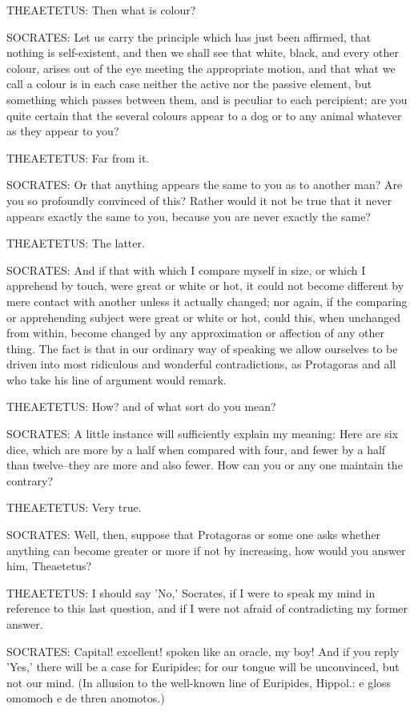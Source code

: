 THEAETETUS: Then what is colour?

SOCRATES: Let us carry the principle which has just been affirmed, that
nothing is self-existent, and then we shall see that white, black,
and every other colour, arises out of the eye meeting the appropriate
motion, and that what we call a colour is in each case neither the
active nor the passive element, but something which passes between
them, and is peculiar to each percipient; are you quite certain that the
several colours appear to a dog or to any animal whatever as they appear
to you?

THEAETETUS: Far from it.

SOCRATES: Or that anything appears the same to you as to another man?
Are you so profoundly convinced of this? Rather would it not be true
that it never appears exactly the same to you, because you are never
exactly the same?

THEAETETUS: The latter.

SOCRATES: And if that with which I compare myself in size, or which
I apprehend by touch, were great or white or hot, it could not become
different by mere contact with another unless it actually changed; nor
again, if the comparing or apprehending subject were great or white
or hot, could this, when unchanged from within, become changed by any
approximation or affection of any other thing. The fact is that in
our ordinary way of speaking we allow ourselves to be driven into most
ridiculous and wonderful contradictions, as Protagoras and all who take
his line of argument would remark.

THEAETETUS: How? and of what sort do you mean?

SOCRATES: A little instance will sufficiently explain my meaning: Here
are six dice, which are more by a half when compared with four, and
fewer by a half than twelve--they are more and also fewer. How can you
or any one maintain the contrary?

THEAETETUS: Very true.

SOCRATES: Well, then, suppose that Protagoras or some one asks whether
anything can become greater or more if not by increasing, how would you
answer him, Theaetetus?

THEAETETUS: I should say 'No,' Socrates, if I were to speak my mind
in reference to this last question, and if I were not afraid of
contradicting my former answer.

SOCRATES: Capital! excellent! spoken like an oracle, my boy! And if you
reply 'Yes,' there will be a case for Euripides; for our tongue will be
unconvinced, but not our mind. (In allusion to the well-known line of
Euripides, Hippol.: e gloss omomoch e de thren anomotos.)

